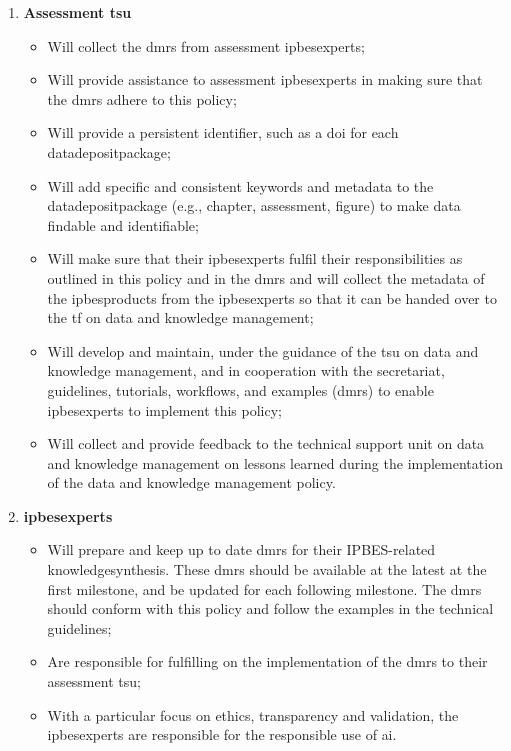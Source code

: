 \documentclass{article}
\begin{document}
\begin{enumerate}[label=(\alph*)]
    \item \textbf{Assessment \gls{tsu}}
    \begin{itemize}
        \item Will collect the \glspl{dmr} from assessment \glspl{ipbesexpert};
        \item Will provide assistance to assessment \glspl{ipbesexpert} in making sure that the \glspl{dmr} adhere to this policy;
        \item Will provide a persistent identifier, such as a \gls{doi} for each \gls{datadepositpackage};
        \item Will add specific and consistent keywords and metadata to the \gls{datadepositpackage} (e.g., chapter, assessment, figure) to make \gls{data} findable and identifiable;
        \item Will make sure that their \glspl{ipbesexpert} fulfil their responsibilities as outlined in this policy and in the \glspl{dmr} and will collect the metadata of the \glspl{ipbesproduct} from the \glspl{ipbesexpert} so that it can be handed over to the \gls{tf} on data and knowledge management;
        \item Will develop and maintain, under the guidance of the \gls{tsu} on \gls{data} and \gls{knowledge} management, and in cooperation with the \gls{secretariat}, guidelines, tutorials, \glspl{workflow}, and examples (\glspl{dmr}) to enable \glspl{ipbesexpert} to implement this policy;
        \item Will collect and provide feedback to the {technical support unit on data and knowledge management} on lessons learned during the implementation of the \gls{data} and \gls{knowledge} management policy.
    \end{itemize}

    \item \textbf{\glspl{ipbesexpert}}
    \begin{itemize}
        \item Will prepare and keep up to date \glspl{dmr} for their IPBES-related \gls{knowledgesynthesis}. These \glspl{dmr} should be available at the latest at the first \gls{milestone}, and be updated for each following \gls{milestone}. The \glspl{dmr} should conform with this policy and follow the examples in the technical guidelines;
        \item Are responsible for fulfilling on the implementation of the \glspl{dmr} to their assessment  \gls{tsu};
        \item With a particular focus on ethics, transparency and validation, the \glspl{ipbesexpert} are responsible for the responsible use of \gls{ai}.
    \end{itemize}
\end{enumerate}
\end{document}
